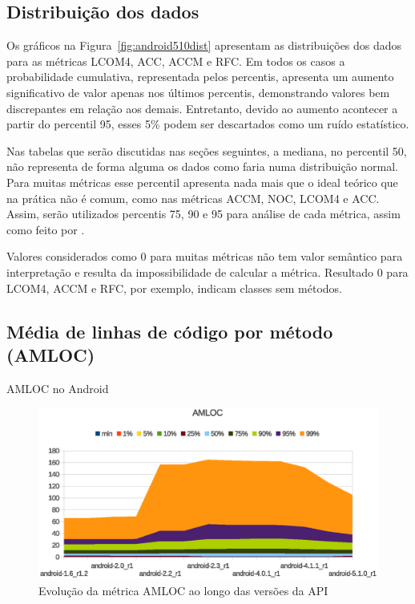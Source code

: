 \subsection{Distribuição dos dados}

Os gráficos na Figura~\ref{fig:android510dist} apresentam as distribuições dos dados para as métricas LCOM4, ACC, ACCM e RFC. Em todos os casos a probabilidade cumulativa, representada pelos percentis, apresenta um aumento significativo de valor apenas nos últimos percentis, demonstrando valores bem discrepantes em relação aos demais. Entretanto, devido ao aumento acontecer a partir do percentil 95, esses 5\% podem ser descartados como um ruído estatístico. 

Nas tabelas que serão discutidas nas seções seguintes, a mediana, no percentil 50, não representa de forma alguma os dados como faria numa distribuição normal. Para muitas métricas esse percentil apresenta nada mais que o ideal teórico que na prática não é comum, como nas métricas ACCM, NOC, LCOM4 e ACC. Assim, serão utilizados percentis 75, 90 e 95 para análise de cada métrica, assim como feito por .

Valores considerados como 0 para muitas métricas não tem valor semântico para interpretação e resulta da impossibilidade de calcular a métrica. Resultado 0 para LCOM4, ACCM e RFC, por exemplo, indicam classes sem métodos.

\subsection{Média de linhas de código por método (AMLOC)}

\begin{table}[!htb]
\centering
{}

\caption{AMLOC no Android}
\label{tab:amloc_android}
\end{table}

\begin{figure}[!htb]
\centering
\includegraphics [keepaspectratio=true,scale=0.85]{figuras/graphs/amloc_android.eps}
\caption{Evolução da métrica AMLOC ao longo das versões da API}
\label{fig:amloc_android}
\end{figure}

